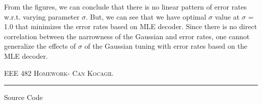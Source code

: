 \documentclass[12pt]{amsart}
\makeatletter
\def\section{\@startsection{section}{1}%
  \z@{.7\linespacing\@plus\linespacing}{.5\linespacing}%
  {\normalfont\scshape}}%
\makeatother
\begin{document}
From the figures, we can conclude that there is no linear pattern of error rates w.r.t. varying parameter $\sigma$. But, we can see that we have optimal $\sigma$ value at $\sigma$ = 1.0 that minimizes the error rates based on MLE decoder. Since there is no direct correlation between the narrowness of the Gaussian and error rates, one cannot generalize the effects of $\sigma$ of the Gaussian tuning with error rates based on the MLE decoder.
\newpage


\newpage
{\scshape EEE 482} \hfill {\scshape \large  Homework-\relax} \hfill {\scshape Can Kocagil}
\smallskip
\hrule
\vspace{2mm}

\section{Source Code}
\end{document}
